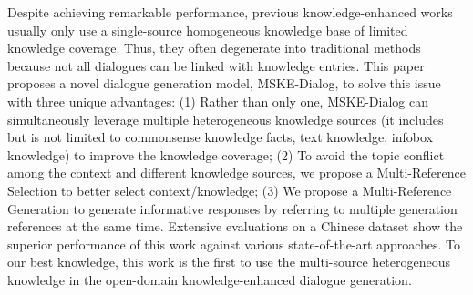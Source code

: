 Despite achieving remarkable performance,  previous knowledge-enhanced works usually only use a single-source homogeneous knowledge base of limited knowledge coverage. Thus, they often degenerate into traditional methods because not all dialogues can be linked with knowledge entries. This paper proposes a novel dialogue generation model, MSKE-Dialog, to solve this issue with three unique advantages: (1) Rather than only one, MSKE-Dialog can simultaneously leverage multiple heterogeneous knowledge sources (it includes but is not limited to  commonsense knowledge facts, text knowledge, infobox knowledge) to improve the knowledge coverage; (2) To avoid the topic conflict among the context and different knowledge sources, we propose a Multi-Reference Selection to better select context/knowledge; (3)  We propose a Multi-Reference Generation to generate informative responses by referring to multiple generation references at the same time. Extensive evaluations on a Chinese dataset show the superior performance of this work against various state-of-the-art approaches. To our best knowledge, this work is the first to use the multi-source heterogeneous knowledge in the open-domain knowledge-enhanced dialogue generation.

